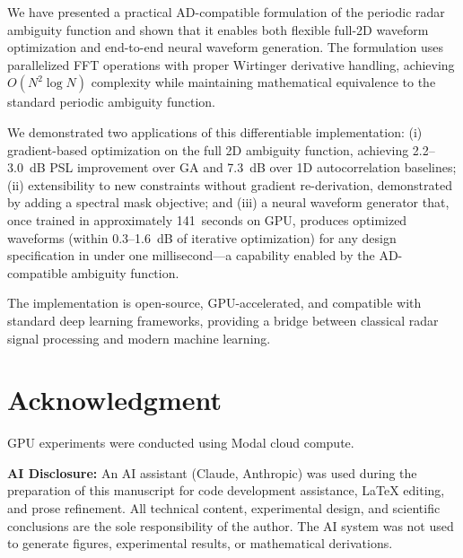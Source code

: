 \documentclass[journal]{IEEEtran}
\begin{document}
We have presented a practical AD-compatible formulation of the periodic radar ambiguity function and shown that it enables both flexible full-2D waveform optimization and end-to-end neural waveform generation.
The formulation uses parallelized FFT operations with proper Wirtinger derivative handling, achieving $O(N^2 \log N)$ complexity while maintaining mathematical equivalence to the standard periodic ambiguity function.

We demonstrated two applications of this differentiable implementation:
(i) gradient-based optimization on the full 2D ambiguity function, achieving 2.2--3.0~dB PSL improvement over GA and 7.3~dB over 1D autocorrelation baselines;
(ii) extensibility to new constraints without gradient re-derivation, demonstrated by adding a spectral mask objective; and
(iii) a neural waveform generator that, once trained in approximately 141~seconds on GPU, produces optimized waveforms (within 0.3--1.6~dB of iterative optimization) for any design specification in under one millisecond---a capability enabled by the AD-compatible ambiguity function.

The implementation is open-source, GPU-accelerated, and compatible with standard deep learning frameworks, providing a bridge between classical radar signal processing and modern machine learning.


\section*{Acknowledgment}
GPU experiments were conducted using Modal cloud compute.

\textbf{AI Disclosure:} An AI assistant (Claude, Anthropic) was used during the preparation of this manuscript for code development assistance, LaTeX editing, and prose refinement.
All technical content, experimental design, and scientific conclusions are the sole responsibility of the author.
The AI system was not used to generate figures, experimental results, or mathematical derivations.




\end{document}
